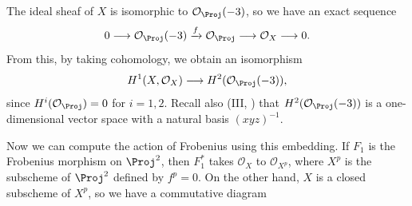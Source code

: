 {\Proof The ideal sheaf of $X$ is isomorphic to $\mathcal O_{\Proj}(-3)$, so we have an exact sequence
\[
0\longrightarrow\mathcal O_{\Proj}(-3)\xrightarrow{f}\mathcal O_{\Proj}\longrightarrow\mathcal O_X\longrightarrow0.
\]
\noindent From this, by taking cohomology, we obtain an isomorphism
\[
H^1(X,\mathcal O_X)\longrightarrow H^2(\mathcal O_{\Proj}(-3)),
\]
\noindent since $H^i(\mathcal O_{\Proj})=0$ for $i=1,2$. Recall also (III, ) that $H^2(\mathcal O_{\Proj}(-3))$ is a one-dimensional vector space with a natural basis $(xyz)^{-1}$.

Now we can compute the action of Frobenius using this embedding. If $F_1$ is the Frobenius morphism on $\Proj^2$, then $F_1^*$ takes $\mathcal O_X$ to $\mathcal O_{X^p}$, where $X^p$ is the subscheme of $\Proj^2$ defined by $f^p=0$. On the other hand, $X$ is a closed subscheme of $X^p$, so we have a commutative diagram
\begin{center}
\end{center}
}
